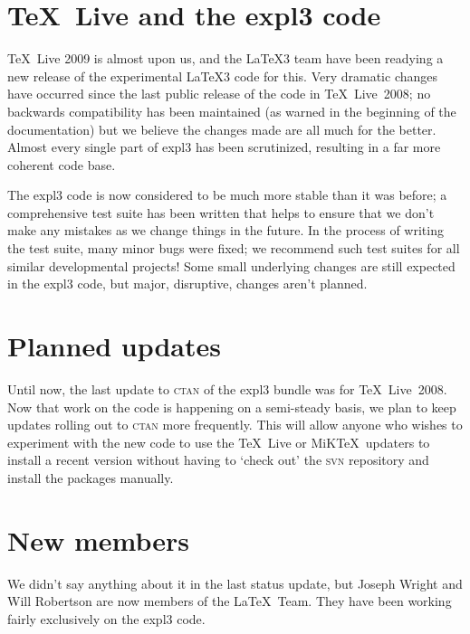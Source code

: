 \documentclass{ltnews}
\begin{document}
\maketitle

\section{\TeX~Live and the \textsf{expl3} code}

\TeX~Live 2009 is almost upon us, and the \LaTeX3 team have been
readying a new release of the experimental \LaTeX3 code for this.
Very dramatic changes have occurred since the
last public release of the code in \TeX~Live~2008; no backwards compatibility has been
maintained (as warned in the beginning of the documentation) but we
believe the changes made are all much for the better. Almost every
single part of \textsf{expl3} has been scrutinized, resulting in a far
more coherent code base.

The \textsf{expl3} code is now considered to be much more stable than
it was before; a comprehensive test suite has been written that helps
to ensure that we don't make any mistakes as we change things in the
future. In the process of writing the test
suite, many minor bugs were fixed; we recommend such test suites for
all similar developmental projects!
Some small underlying changes are still expected in the
\textsf{expl3} code, but major, disruptive, changes aren't planned.

\section{Planned updates}

Until now, the last update to \textsc{ctan} of the \textsf{expl3}
bundle was for \TeX~Live~2008. Now that work on the code is happening
on a semi-steady basis, we plan to keep updates rolling out to
\textsc{ctan} more frequently. This will allow anyone who wishes to
experiment with the new code to use the \TeX~Live or MiK\TeX\
updaters to install a recent version without having to `check out' the
\textsc{svn} repository and install the packages manually.

\section{New members}

We didn't say anything about it in the last status update, but Joseph
Wright and Will Robertson are now members of the \LaTeX\ Team. They
have been working fairly exclusively on the \textsf{expl3} code.
\end{document}
